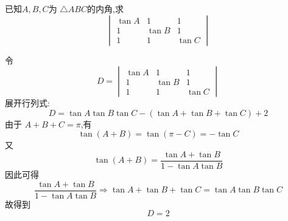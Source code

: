 \begin{questions}
    \question 已知$A,B,C$为 $\triangle ABC$的内角,求  
    \[
    \begin{vmatrix} 
    \tan A & 1 & 1 \\ 
    1 & \tan B & 1 \\ 
    1 & 1 & \tan C 
    \end{vmatrix}
    \]
    \begin{solution}
        令\[
        D=\begin{vmatrix} 
        \tan A & 1 & 1 \\ 
        1 & \tan B & 1 \\ 
        1 & 1 & \tan C 
        \end{vmatrix}
        \]
        展开行列式:
        \[
        D = \tan A \tan B \tan C - (\tan A + \tan B + \tan C) + 2
        \]
        由于 $A + B + C = \pi$,有
        \[
        \tan(A + B) = \tan(\pi - C) = -\tan C
        \]
        又
        \[
        \tan(A + B) = \frac{\tan A + \tan B}{1 - \tan A \tan B}
        \]
        因此可得
        \[
        \frac{\tan A + \tan B}{1 - \tan A \tan B} \Rightarrow \tan A + \tan B + \tan C = \tan A \tan B \tan C
        \]
        故得到
        \[
        D = 2
        \]
    \end{solution}


\end{questions}
